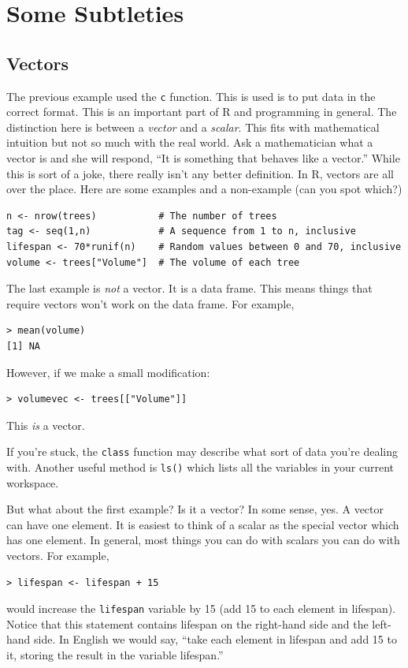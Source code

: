 \documentclass[12pt]{article}
\theoremstyle{remark}
\begin{document}
\section{Some Subtleties}
\subsection{Vectors}
The previous example used the \verb|c| function. This is used is to put data in the correct format. This is an important part of R and programming in general. The distinction here is between a \emph{vector} and a \emph{scalar}. This fits with mathematical intuition but not so much with the real world. Ask a mathematician what a vector is and she will respond, ``It is something that behaves like a vector.'' While this is sort of a joke, there really isn't any better definition. In R, vectors are all over the place. Here are some examples and a non-example (can you spot which?)
\begin{Verbatim}[frame=single, fontsize=\small]
n <- nrow(trees)           # The number of trees
tag <- seq(1,n)            # A sequence from 1 to n, inclusive
lifespan <- 70*runif(n)    # Random values between 0 and 70, inclusive
volume <- trees["Volume"]  # The volume of each tree
\end{Verbatim}

The last example is \emph{not} a vector. It is a data frame. This means things that require vectors won't work on the data frame. For example,
\begin{verbatim}
> mean(volume)
[1] NA
\end{verbatim}

However, if we make a small modification:
\begin{verbatim}
> volumevec <- trees[["Volume"]]
\end{verbatim}
This \emph{is} a vector.

If you're stuck, the \verb|class| function may describe what sort of data you're dealing with. Another useful method is \verb|ls()| which lists all the variables in your current workspace.

But what about the first example? Is it a vector? In some sense, yes. A vector can have one element. It is easiest to think of a scalar as the special vector which has one element. In general, most things you can do with scalars you can do with vectors. For example,
\begin{verbatim}
> lifespan <- lifespan + 15
\end{verbatim}
would increase the \verb|lifespan| variable by 15 (add 15 to each element in lifespan). Notice that this statement contains lifespan on the right-hand side and the left-hand side. In English we would say, ``take each element in lifespan and add 15 to it, storing the result in the variable lifespan.''
\end{document}
